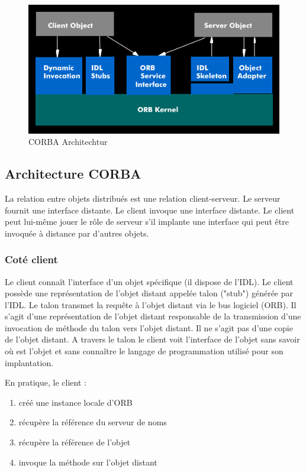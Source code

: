     \begin{figure}[h]
        \centering
        \includegraphics[scale= 0.77]{archiCorba/CORBA-Architektur.png}
        \caption{CORBA Architechtur}
    \end{figure}

    \subsection{Architecture CORBA}

        La relation entre objets distribués est une relation client-serveur. Le serveur fournit une interface distante. Le client invoque une interface distante. Le client peut lui-même jouer le rôle de serveur s'il implante une interface qui peut être invoquée à distance par d'autres objets. 
        \subsubsection*{Coté client}
        Le client connaît l'interface d'un objet spécifique (il dispose de l'IDL). Le client possède une représentation de l'objet distant appelée talon ("stub") générée par l'IDL. Le talon transmet la requête à l'objet distant via le bus logiciel (ORB). Il s'agit d'une représentation de l'objet distant responsable de la transmission d'une invocation de méthode du talon vers l'objet distant. Il ne s'agit pas d'une copie de l'objet distant.
            A travers le talon le client voit l'interface de l'objet sans savoir où est l'objet et sans connaître le langage de programmation utilisé pour son implantation.
            
            En pratique, le client :
            \begin{enumerate}
                \item créé une instance locale d'ORB
                \item récupère la référence du serveur de noms
                \item récupère la référence de l'objet
                \item invoque la méthode sur l'objet distant
            \end{enumerate}
